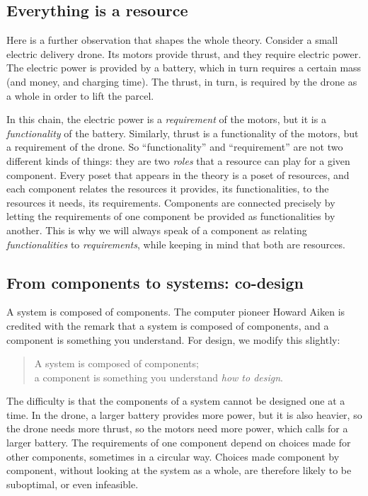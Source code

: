 \subsection{Everything is a resource}

Here is a further observation that shapes the whole theory.
Consider a small electric delivery drone.
Its motors provide thrust, and they require electric power.
The electric power is provided by a battery, which in turn requires a certain mass (and money, and charging time).
The thrust, in turn, is required by the drone as a whole in order to lift the parcel.

In this chain, the electric power is a \emph{requirement} of the motors, but it is a \emph{functionality} of the battery.
Similarly, thrust is a functionality of the motors, but a requirement of the drone.
So ``functionality'' and ``requirement'' are not two different kinds of things: they are two \emph{roles} that a resource can play for a given component.
Every poset that appears in the theory is a poset of resources, and each component relates the resources it provides, its functionalities, to the resources it needs, its requirements.
Components are connected precisely by letting the requirements of one component be provided as functionalities by another.
This is why we will always speak of a component as relating \emph{functionalities} to \emph{requirements}, while keeping in mind that both are resources.

\subsection{From components to systems: co-design}

A system is composed of components.
The computer pioneer Howard Aiken is credited with the remark that a system is composed of components, and a component is something you understand.
For design, we modify this slightly:

\begin{quote}
    A system is composed of components;\\
    a component is something you understand \emph{how to design}.
\end{quote}

The difficulty is that the components of a system cannot be designed one at a time.
In the drone, a larger battery provides more power, but it is also heavier, so the drone needs more thrust, so the motors need more power, which calls for a larger battery.
The requirements of one component depend on choices made for other components, sometimes in a circular way.
Choices made component by component, without looking at the system as a whole, are therefore likely to be suboptimal, or even infeasible.

